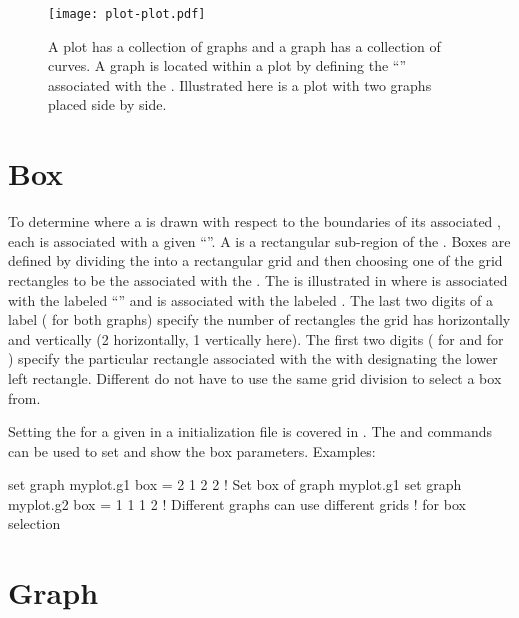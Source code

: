 {{{%

\begin{figure}[bt]
  \centering
  \texttt{[image: plot-plot.pdf]}
  \caption[Plotting nomenclature.]
  {
A plot has a collection of graphs and a graph has a collection of curves. A graph is located within
a plot by defining the ``'' associated with the . Illustrated here is a plot with
two graphs placed side by side.
  }
  \label{f:plot.plot}
\end{figure}

\section{Box}
\label{s:box.def}

To determine where a  is drawn with respect to the boundaries of its associated ,
each  is associated with a given ``''. A  is a rectangular sub-region of
the . Boxes are defined by dividing the  into a rectangular grid and then choosing
one of the grid rectangles to be the  associated with the . The is illustrated in
 where  is associated with the  labeled ``'' and
 is associated with the  labeled .  The last two digits of a
 label ( for both graphs) specify the number of rectangles the grid has horizontally
and vertically (2 horizontally, 1 vertically here). The first two digits ( for 
and  for ) specify the particular rectangle associated with the  with
 designating the lower left rectangle. Different  do not have to use the same
grid division to select a box from.

Setting the  for a given  in a \tao initialization file is covered in .
The  and  commands can be used to set and show the box parameters. 
Examples:
\begin{example}
  set graph myplot.g1 box = 2 1 2 2  ! Set box of graph myplot.g1
  set graph myplot.g2 box = 1 1 1 2  ! Different graphs can use different grids
                                     !  for box selection
\end{example}

\section{Graph}
\label{s:graph.def}

}}}
